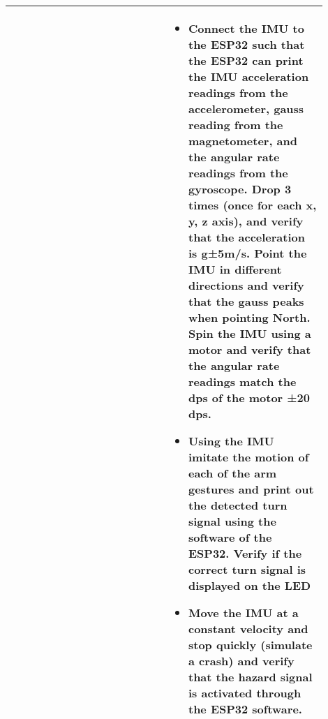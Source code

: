 \begin{table}[h]
\begin{tabular}{p{0.45\linewidth}p{0.45\linewidth}}
\begin{itemize}[leftmargin=*, nosep, after=\strut]
\begin{itemize}[nosep]
        \end{itemize}
    \end{itemize} &
    \begin{itemize}[leftmargin=*, nosep, after=\strut]
        \item Connect the IMU to the ESP32 such that the ESP32 can print the IMU acceleration readings from the accelerometer, gauss reading from the magnetometer, and the angular rate readings from the gyroscope. Drop 3 times (once for each x, y, z axis), and verify that the acceleration is g±5m/s. Point the IMU in different directions and verify that the gauss peaks when pointing North. Spin the IMU using a motor and verify that the angular rate readings match the dps of the motor ±20 dps.
        \item Using the IMU imitate the motion of each of the arm gestures and print out the detected turn signal using the software of the ESP32. Verify if the correct turn signal is displayed on the LED
        \item Move the IMU at a constant velocity and stop quickly (simulate a crash) and verify that the hazard signal is activated through the ESP32 software.
    \end{itemize} \\
    \bottomrule
    \end{tabular}
    \end{table}
    \newpage
